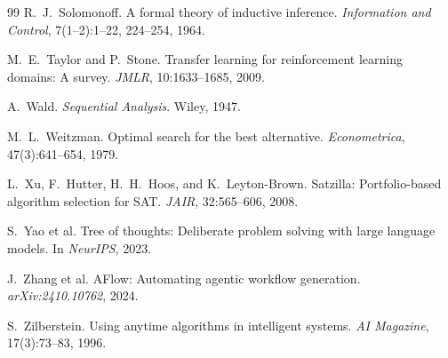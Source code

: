 \documentclass[10pt]{article}
\theoremstyle{paperplain}
\theoremstyle{paperdefinition}
\theoremstyle{paperremark}
\begin{document}
\begin{thebibliography}{99}
R.~J.~Solomonoff.
\newblock A formal theory of inductive inference.
\newblock \emph{Information and Control}, 7(1--2):1--22, 224--254, 1964.

M.~E.~Taylor and P.~Stone.
\newblock Transfer learning for reinforcement learning domains: A survey.
\newblock \emph{JMLR}, 10:1633--1685, 2009.

A.~Wald.
\newblock \emph{Sequential Analysis}.
\newblock Wiley, 1947.

M.~L.~Weitzman.
\newblock Optimal search for the best alternative.
\newblock \emph{Econometrica}, 47(3):641--654, 1979.

L.~Xu, F.~Hutter, H.~H.~Hoos, and K.~Leyton-Brown.
\newblock Satzilla: Portfolio-based algorithm selection for SAT.
\newblock \emph{JAIR}, 32:565--606, 2008.

S.~Yao et al.
\newblock Tree of thoughts: Deliberate problem solving with large language models.
\newblock In \emph{NeurIPS}, 2023.

J.~Zhang et al.
\newblock AFlow: Automating agentic workflow generation.
\newblock \emph{arXiv:2410.10762}, 2024.

S.~Zilberstein.
\newblock Using anytime algorithms in intelligent systems.
\newblock \emph{AI Magazine}, 17(3):73--83, 1996.

\end{thebibliography}
\end{document}
